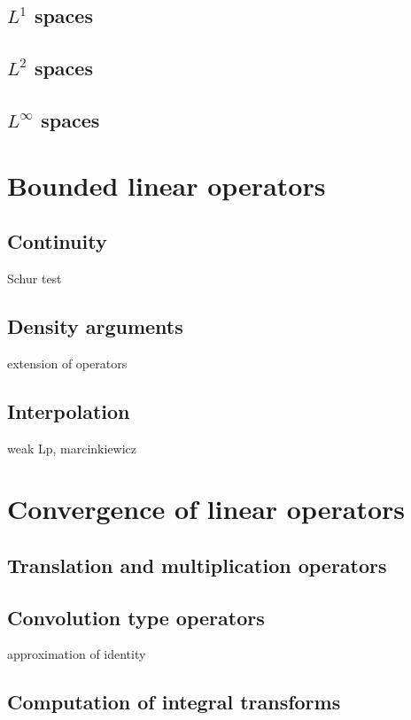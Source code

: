 \documentclass{../note}
\begin{document}
\section{$L^1$ spaces}
\section{$L^2$ spaces}
\section{$L^\infty$ spaces}








\chapter{Bounded linear operators}
\section{Continuity}
Schur test

\section{Density arguments}
extension of operators

\section{Interpolation}
weak Lp, marcinkiewicz




\chapter{Convergence of linear operators}
\section{Translation and multiplication operators}

\section{Convolution type operators}
approximation of identity

\section{Computation of integral transforms}
\end{document}
